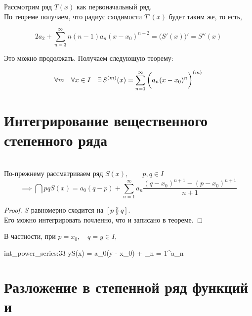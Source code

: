 Рассмотрим ряд $ T(x) $ как первоначальный ряд. \\
По теореме получаем, что радиус сходимости $ T'(x) $ будет таким же, то есть,

\begin{implication}
	$$ 2a_2 + \sum_{n = 3}^\infty n(n - 1)a_n(x - x_0)^{n - 2} = \bigg( S'(x) \bigg)' = S''(x) $$
\end{implication}

Это можно продолжать. Получаем следующую теорему:

\begin{theorem}
	$$ \forall m \quad \forall x \in I \quad \exists\, S^{(m)}(x) = \sum_{n = 1}^\infty \bigg( a_n(x - x_0)^n \bigg)^{(m)} $$
\end{theorem}

\section{Интегрирование вещественного степенного ряда}

\begin{theorem}
	\hfill \\
	По-прежнему рассматриваем ряд $ S(x), \qquad p, q \in I $ \nimp[(не обязательно $ p < q $)]
	$$ \implies \dint pq{S(x)} = a_0(q - p) + \sum_{n = 1}^\infty a_n \frac{(q - x_0)^{n + 1} - (p - x_0)^{n + 1}}{n + 1} $$
\end{theorem}

\begin{proof}
	$ S $ равномерно сходится на $ [p \between q] $. \\
	Его можно интегрировать почленно, что и записано в теореме.
\end{proof}

\begin{statement}
	В частности, при $ p = x_0, \quad q = y \in I $,
	\begin{equ}{int_power_series:33}
		y{S(x)} = a_0(y - x_0) + \sum_{n = 1}^\infty a_n 
	\end{equ}
\end{statement}

\section{Разложение в степенной ряд функций  и }

